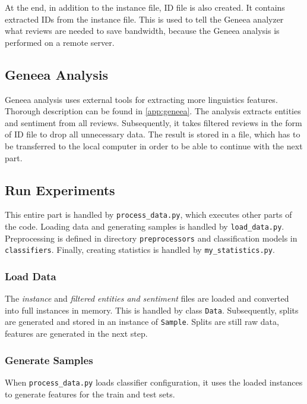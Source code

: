 At the end, in addition to the instance file, ID file is also created.
It contains extracted IDs from the instance file.
This is used to tell the Geneea analyzer what reviews are needed to save bandwidth,
because the Geneea analysis is performed on a remote server.

\subsection{Geneea Analysis}

Geneea analysis uses external tools for extracting more linguistics features.
Thorough description can be found in \autoref{app:geneea}.
The analysis extracts entities and sentiment from all reviews.
Subsequently, it takes filtered reviews in the form of ID file to drop all unnecessary data.
The result is stored in a file, which has to be transferred to the local computer in order to be able to continue with the next part.





\subsection{Run Experiments}

This entire part is handled by \texttt{process\_data.py}, which executes other parts of the code.
Loading data and generating samples is handled by \texttt{load\_data.py}.
Preprocessing is defined in directory \texttt{preprocessors} and classification models in \texttt{classifiers}.
Finally, creating statistics is handled by \texttt{my\_statistics.py}.


\subsubsection{Load Data}

The \textit{instance} and \textit{filtered entities and sentiment} files are loaded and
converted into full instances in memory.
This is handled by class \texttt{Data}.
Subsequently, splits are generated and stored in an instance of \texttt{Sample}.
Splits are still raw data, features are generated in the next step.

\subsubsection{Generate Samples}

When \texttt{process\_data.py} loads classifier configuration,
it uses the loaded instances to generate features for the train and test sets.

